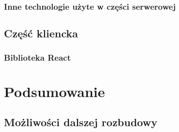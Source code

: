 \documentclass[shortabstract,inz]{iithesis}
\begin{document}
\subsection{Inne technologie użyte w  części serwerowej}
\section{Część kliencka}
\subsection{Biblioteka React}

\chapter{Podsumowanie}
\section{Możliwości dalszej rozbudowy}



\end{document}
